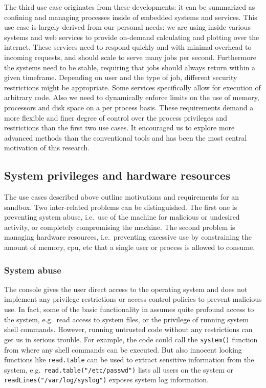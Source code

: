 The third use case originates from these developments: it can be summarized as
confining and managing \R processes inside of embedded systems and services.
This use case is largely derived from our personal needs: we are using \R inside
various systems and web services to provide on-demand calculating and plotting
over the internet. These services need to respond quickly and with minimal
overhead to incoming requests, and should scale to serve many jobs per second.
Furthermore the systems need to be stable, requiring that jobs should always
return within a given timeframe. Depending on user and the type of job,
different security restrictions might be appropriate. Some services specifically
allow for execution of arbitrary \R code. Also we need to dynamically enforce
limits on the use of memory, processors and disk space on a per process basis.
These requirements demand a more flexible and finer degree of control over the
process privileges and restrictions than the first two use cases. It encouraged
us to explore more advanced methods than the conventional tools and has been
the most central motivation of this research.

\subsection{System privileges and hardware resources}

The use cases described above outline motivations and requirements for an \R
sandbox. Two inter-related problems can be distinguished. The first one is
preventing system abuse, i.e.\ use of the machine for malicious or undesired
activity, or completely compromising the machine. The second problem is managing
hardware resources, i.e.\ preventing excessive use by constraining the amount of
memory, cpu, etc that a single user or process is allowed to consume.

\subsubsection{System abuse}

The \R console gives the user direct access to the operating system and does not
implement any privilege restrictions or access control policies to prevent
malicious use. In fact, some of the basic functionality in \R assumes quite
profound access to the system, e.g.\ read access to system files, or the
privilege of running system shell commands. However, running untrusted \R code
without any restrictions can get us in serious trouble. For example, the code
could call the \texttt{system()} function from where any shell commands can be
executed. But also innocent looking functions like \texttt{read.table} can be
used to extract sensitive information from the system, e.g.\
\texttt{read.table("/etc/passwd")} lists all users on the system or
\texttt{readLines("/var/log/syslog")} exposes system log information.

